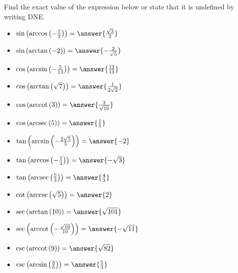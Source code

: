 \documentclass{ximera}
\author{Carl Stitz \and Jeff Zeager \and Bart Snapp \and Matthew Carr}
\begin{document}
\begin{exercise}
Find the exact value of the expression below or state that it is undefined by writing DNE.
\begin{itemize}
\item  $\sin\left(\arccos\left(-\frac{1}{2}\right)\right)=\answer{\frac{\sqrt{3}}{2}}$ 
\item  $\sin\left(\arctan\left(-2\right)\right)=\answer{-\frac{2}{\sqrt{5}}}$ 
\item  $\cos\left(\arcsin\left(-\frac{5}{13}\right)\right)=\answer{\frac{12}{13}}$
\item  $\cos\left(\arctan\left(\sqrt{7} \right)\right)=\answer{\frac{1}{2\sqrt{2}}}$
\item  $\cos\left(\arccot\left( 3 \right)\right)=\answer{\frac{3}{\sqrt{10}}}$
\item  $\cos\left(\arcsec\left( 5 \right)\right)=\answer{\frac{1}{5}}$
\item  $\tan\left(\arcsin\left(-\frac{2\sqrt{5}}{5}\right)\right)=\answer{-2}$
\item  $\tan\left(\arccos\left(-\frac{1}{2}\right)\right)=\answer{-\sqrt{3}}$ 
\item  $\tan\left(\arcsec\left(\frac{5}{3}\right)\right)=\answer{\frac{4}{3}}$ 
\item  $\cot\left(\arccsc\left(\sqrt{5}\right)\right)=\answer{2}$ 
\item  $\sec\left(\arctan\left(10\right)\right)=\answer{\sqrt{101}}$ 
\item  $\sec\left(\arccot\left(-\frac{\sqrt{10}}{10}\right)\right)=\answer{-\sqrt{11}}$
\item  $\csc\left(\arccot\left(9 \right)\right)=\answer{\sqrt{82}}$ 
\item  $\csc\left(\arcsin\left(\frac{3}{5}\right)\right)=\answer{\frac{5}{3}}$
\end{itemize}


\end{exercise}
\end{document}

